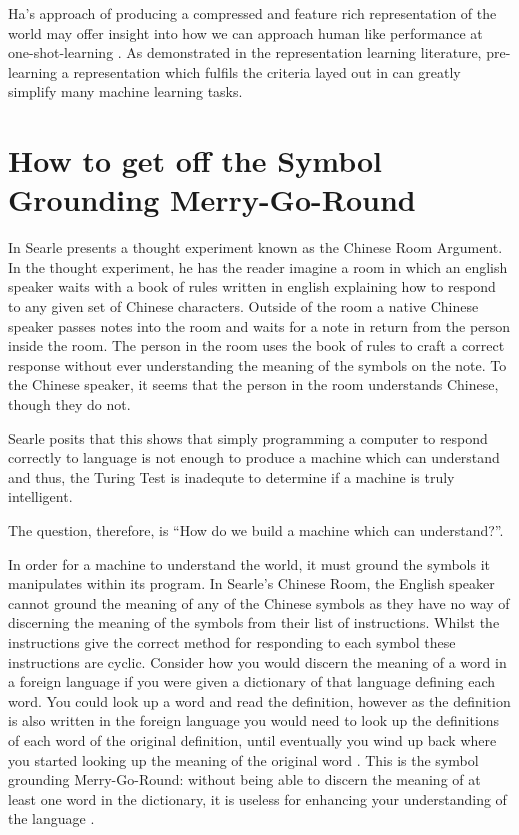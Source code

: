 Ha's approach of producing a compressed and feature rich representation of the world \cite{ha2018world, ha2018recurrent} may offer insight into how we can approach human like performance at one-shot-learning \cite{vinyals2016matching}. As demonstrated in the representation learning literature, pre-learning a representation which fulfils the criteria layed out in \cite{repRev} can greatly simplify many machine learning tasks.


\section{How to get off the Symbol Grounding Merry-Go-Round} 
In \cite{searle1980minds} Searle presents a thought experiment known as the Chinese Room Argument. In the thought experiment, he has the reader imagine a room in which an english speaker waits with a book of rules written in english explaining how to respond to any given set of Chinese characters. Outside of the room a native Chinese speaker passes notes into the room and waits for a note in return from the person inside the room. The person in the room uses the book of rules to craft a correct response without ever understanding the meaning of the symbols on the note. To the Chinese speaker, it seems that the person in the room understands Chinese, though they do not.

Searle posits that this shows that simply programming a computer to respond correctly to language is not enough to produce a machine which can understand and thus, the Turing Test \cite{turing2009computing} is inadequte to determine if a machine is truly intelligent.

The question, therefore, is ``How do we build a machine which can understand?''.

In order for a machine to understand the world, it must ground the symbols it manipulates within its program. In Searle's Chinese Room, the English speaker cannot ground the meaning of any of the Chinese symbols as they have no way of discerning the meaning of the symbols from their list of instructions. Whilst the instructions give the correct method for responding to each symbol these instructions are cyclic. Consider how you would discern the meaning of a word in a foreign language if you were given a dictionary of that language defining each word. You could look up a word and read the definition, however as the definition is also written in the foreign language you would need to look up the definitions of each word of the original definition, until eventually you wind up back where you started looking up the meaning of the original word \cite{cangelosi2000robotic}. This is the symbol grounding Merry-Go-Round: without being able to discern the meaning of at least one word in the dictionary, it is useless for enhancing your understanding of the language \cite{harnad1990symbol}.


